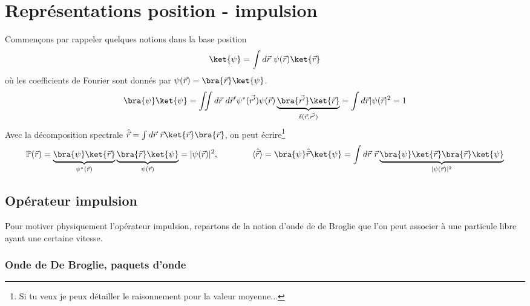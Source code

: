 \chapter{Représentations position - impulsion}
Commençons par rappeler quelques notions dans la base position
\begin{equation}
\ket{\psi} = \int d\vec r\ \psi(\vec{r})\ket{\vec{r}}
\end{equation}
où les coefficients de Fourier sont donnés par $\psi(\vec{r}) = \bra{\vec{r}}\ket{\psi}$.
\begin{equation}
\bra{\psi}\ket{\psi} = \iint d\vec r\ d\vec r'\psi^*(\vec{r'})\psi(\vec{r})\underbrace{
\bra{\vec{r'}}\ket{\vec{r}}}_{\delta(\vec{r},\vec{r'})} = \int d\vec r |\psi(\vec{r}|^2=1
\end{equation}
Avec la décomposition spectrale $\hat{\vec{r}} = \int d\vec{r}\ \vec{r}\ket{\vec{r}}\bra{\vec{r}}$, 
on peut écrire\footnote{Si tu veux je peux détailler le raisonnement pour la valeur moyenne...}
\begin{equation}
\mathbb{P}(\vec{r}) = \underbrace{\bra{\psi}\ket{\vec{r}}}_{\psi^*(\vec{r})}\underbrace{
\bra{\vec{r}}\ket{\psi}}_{\psi(\vec{r})} = |\psi(\vec{r})|^2,\qquad\qquad\langle\hat{\vec{r}}\rangle = 
\bra{\psi}\hat{\vec{r}}\ket{\psi} = \int d\vec{r}\ \vec{r}\underbrace{\bra{\psi}\ket{\vec{r}}
\bra{\vec{r}}\ket{\psi}}_{|\psi(\vec{r})|^2}
\end{equation}

\section{Opérateur impulsion}
Pour motiver physiquement l'opérateur impulsion, repartons de la notion d'onde de de Broglie que 
l'on peut associer à une particule libre ayant une certaine vitesse. 
\subsection{Onde de De Broglie, paquets d'onde}

